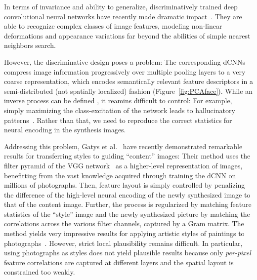 \documentclass[10pt,twocolumn,letterpaper]{article}
\begin{document}
In terms of invariance and ability to generalize, discriminatively trained deep convolutional neural networks have recently made dramatic impact~\cite{Krizhevsky2012,Simonyan14c}. They are able to recognize complex classes of image features, modeling non-linear deformations and appearance variations far beyond the abilities of simple nearest neighbors search.

However, the discriminative design poses a problem: The corresponding dCNNs compress image information progressively over multiple pooling layers to a very coarse representation, which encodes semantically relevant feature descriptors in a semi-distributed (not spatially localized) fashion (Figure~\ref{fig:PCAface}). While an inverse process can be defined \cite{Denton15,Dong15,Gatys15,Gatys2015b,Gauthier15,Mahendran15,Xu15,Zeiler14}, it reamins difficult to control: For example, simply maximizing the class-excitation of the network leads to hallucinatory patterns~\cite{Mordvintsev15}. Rather than that, we need to reproduce the correct statistics for neural encoding in the synthesis images. 


Addressing this problem, Gatys et al.~\cite{Gatys15,Gatys2015b} have recently demonstrated remarkable results for transferring styles to guiding ``content'' images: Their method uses the filter pyramid of the VGG network~\cite{Simonyan14c} as a higher-level representation of images, benefitting from the vast knowledge acquired through training the dCNN on millions of photographs. Then, feature layout is simply controlled by penalizing the difference of the high-level neural encoding of the newly synthesized image to that of the content image. Further, the process is regularized by matching feature statistics of the ``style'' image and the newly synthesized picture by matching the correlations across the various filter channels, captured by a Gram matrix. The method yields very impressive results for applying artistic styles of paintings to photographs~\cite{Gatys15}. However, strict local plausibility remains difficult. In particular, using photographs as styles does not yield plausible results because only \emph{per-pixel} feature correlations are captured at different layers and the spatial layout is constrained too weakly.
\end{document}
